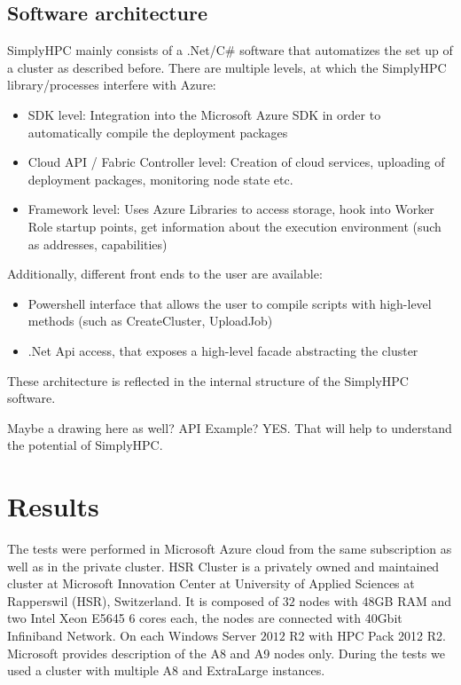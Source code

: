 \documentclass[3p,times]{elsarticle}
\begin{document}
\subsection{Software architecture}
SimplyHPC mainly consists of a .Net/C\# software that automatizes the set up of a cluster as described before.
There are multiple levels, at which the SimplyHPC library/processes interfere with Azure:

\begin{itemize}
	\item SDK level: Integration into the Microsoft Azure SDK in order to automatically compile the deployment packages
	
	\item Cloud API / Fabric Controller level: Creation of cloud services, uploading of deployment packages, monitoring node state etc.
	
	\item Framework level: Uses Azure Libraries to access storage, hook into Worker Role startup points, get information about the execution environment (such as addresses, capabilities)
\end{itemize}

Additionally, different front ends to the user are available:

\begin{itemize}

\item Powershell interface that allows the user to compile scripts with high-level methods (such as CreateCluster, UploadJob)

\item .Net Api access, that exposes a high-level facade abstracting the cluster 
\end{itemize}

These architecture is reflected in the internal structure of the SimplyHPC software.

\textcolor[rgb]{1,0,0}{Maybe a drawing here as well? API Example? YES. That will help to understand the potential of SimplyHPC.}


\section{Results}
\label{sec:results}
	
The tests were performed in Microsoft Azure cloud from the same subscription as well as in the private cluster. HSR Cluster is a privately owned and maintained cluster at Microsoft Innovation Center at University of Applied Sciences at Rapperswil (HSR), Switzerland. It is composed of $32$ nodes with 48GB RAM and two Intel Xeon E5645 6 cores each, the nodes are connected with 40Gbit Infiniband Network. On each Windows Server $2012$ R2 with HPC Pack 2012 R2. Microsoft provides description of the A8 and A9 nodes only. During the tests we used a cluster with multiple A8 and ExtraLarge instances.
\end{document}
